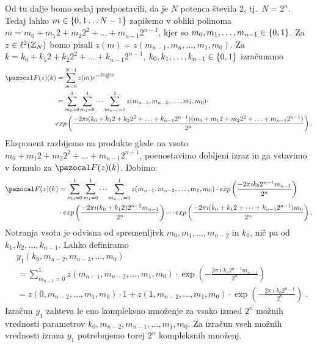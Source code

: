 Od tu dalje bomo sedaj predpostavili, da je $N$ potenca števila 2, tj.\ $N = 2^n$. Tedaj lahko $m \in \left\{0,1 \ldots N-1\right\}$ zapišemo v obliki polinoma $m = m_0 + m_1 2 + m_2 2^2 + \ldots + m_{n-1} 2^{n-1}$, kjer so $m_0, m_1, \ldots, m_{n-1} \in \left\{0, 1\right\}$. Za $z \in \ell^2(\mathbb Z_N)$ bomo pisali $z(m) = z(m_{n-1}, m_n, \ldots, m_1, m_0)$. Za $k = k_0 + k_1 2 + k_2 2^2 + \ldots + k_{n-1} 2^{n-1}$, $k_0, k_1, \ldots, k_{n-1} \in \left\{0, 1\right\}$ izračunamo
%
\begin{align*}
  \F(z)(k) & = \sum_{m=0}^{N-1} z(m) e^{-\frac{2\pi\imath km}{N}} \\
  & = \sum_{m_0 = 0}^1 \sum_{m_1 = 0}^1 \cdots \sum_{m_{n-1} = 0}^1 z(m_{n-1}, m_{n-2}, \ldots, m_1, m_0) \cdot \\
 \cdot & exp\left(\frac{-2\pi\imath(k_0 + k_1 2 + k_2 2^2 + \ldots + k_{n-1} 2^{n-1})(m_0 + m_1 2 + m_2 2^2 + \ldots + m_{n-1} 2^{n-1})}{2^n}\right). 
\end{align*}
%
Eksponent razbijemo na produkte glede na vsoto $m_0 + m_1 2 + m_2 2^2 + \ldots + m_{n-1} 2^{n-1}$, poenostavimo dobljeni izraz in ga vstavimo v formulo za $\F(z)(k)$. Dobimo:
%
\begin{align*}
\F(z)(k) & = \sum_{m_0 = 0}^1 \sum_{m_1 = 0}^1 \cdots \sum_{m_{n-1} = 0}^1 z(m_{n-1}, m_{n-2}, \ldots, m_1, m_0) \cdot exp\left(\frac{-2\pi\imath k_02^{n-1}m_{n-1}}{2^n}\right) \\
&  \cdot exp\left(\frac{-2\pi\imath (k_0 + k_1 2)2^{n-2}m_{n-2}}{2^n}\right) \cdots exp\left(\frac{-2\pi\imath (k_0 + k_1 2 + \cdots +  k_{n-1} 2^{n-1}) m_0}{2^n}\right).
\end{align*}
%
Notranja vsota je odvisna od spremenljivk $m_0, m_1, \ldots, m_{n-2}$ in $k_0$, nič pa od $k_1, k_2, \ldots, k_{n-1}$. Lahko definiramo
\begin{align*}
  & y_1(k_0, m_{n-2}, m_{n-3},  \ldots, m_0)\\
  & = \sum_{m_{n-1}=0}^{1} z(m_{n-1},m_{n-2},\ldots,m_1,m_0) \cdot \exp\left(-\frac{2\pi\imath k_0 2^{n-1}m_{n-1}}{2^n}\right)\\
  & = z(0,m_{n-2},\ldots,m_1,m_0) \cdot 1 + z(1,m_{n-2},\ldots,m_1,m_0)\cdot \exp\left(-\frac{2\pi\imath k_0 2^{n-1}}{2^n}\right) \;.
\end{align*}
%
Izračun $y_1$ zahteva le eno kompleksno množenje za vsako izmed $2^n$ možnih vrednosti parametrov $k_0, m_{n-2}, m_{n-1}, \ldots, m_1, m_0$. Za izračun vseh možnih vrednosti izraza $y_1$ potrebujemo torej $2^n$ kompleksnih množenj.

